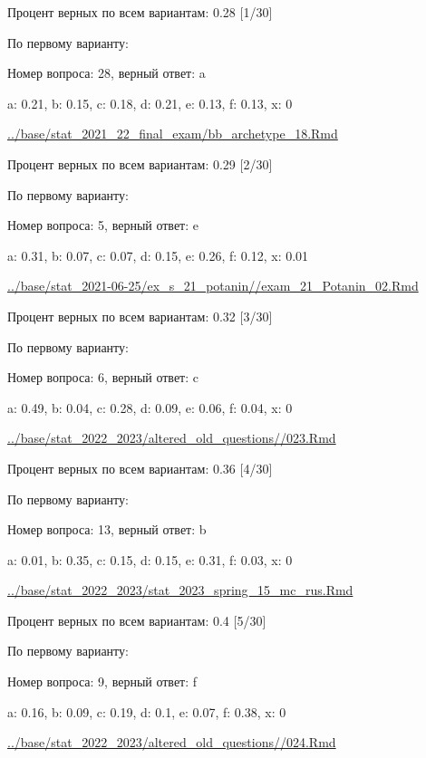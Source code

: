 

Процент верных по всем вариантам: 0.28 [1/30]

По первому варианту:

Номер вопроса: 28, верный ответ: a

a: 0.21, b: 0.15, c: 0.18, d: 0.21, e: 0.13, f: 0.13, x: 0

\url{../base/stat_2021_22_final_exam/bb_archetype_18.Rmd}





Процент верных по всем вариантам: 0.29 [2/30]

По первому варианту:

Номер вопроса: 5, верный ответ: e

a: 0.31, b: 0.07, c: 0.07, d: 0.15, e: 0.26, f: 0.12, x: 0.01

\url{../base/stat_2021-06-25/ex_s_21_potanin//exam_21_Potanin_02.Rmd}





Процент верных по всем вариантам: 0.32 [3/30]

По первому варианту:

Номер вопроса: 6, верный ответ: c

a: 0.49, b: 0.04, c: 0.28, d: 0.09, e: 0.06, f: 0.04, x: 0

\url{../base/stat_2022_2023/altered_old_questions//023.Rmd}





Процент верных по всем вариантам: 0.36 [4/30]

По первому варианту:

Номер вопроса: 13, верный ответ: b

a: 0.01, b: 0.35, c: 0.15, d: 0.15, e: 0.31, f: 0.03, x: 0

\url{../base/stat_2022_2023/stat_2023_spring_15_mc_rus.Rmd}





Процент верных по всем вариантам: 0.4 [5/30]

По первому варианту:

Номер вопроса: 9, верный ответ: f

a: 0.16, b: 0.09, c: 0.19, d: 0.1, e: 0.07, f: 0.38, x: 0

\url{../base/stat_2022_2023/altered_old_questions//024.Rmd}



